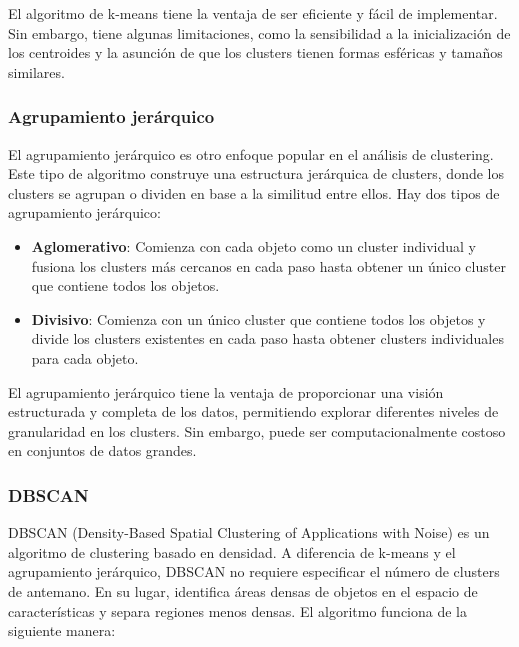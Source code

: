 \documentclass{article}
\begin{document}
El algoritmo de k-means tiene la ventaja de ser eficiente y fácil de implementar. Sin embargo, tiene algunas limitaciones, como la sensibilidad a la inicialización de los centroides y la asunción de que los clusters tienen formas esféricas y tamaños similares.
\subsubsection{Agrupamiento jerárquico}
El agrupamiento jerárquico es otro enfoque popular en el análisis de clustering. Este tipo de algoritmo construye una estructura jerárquica de clusters, donde los clusters se agrupan o dividen en base a la similitud entre ellos. Hay dos tipos de agrupamiento jerárquico:

\begin{itemize}
  \item \textbf{Aglomerativo}: Comienza con cada objeto como un cluster individual y fusiona los clusters más cercanos en cada paso hasta obtener un único cluster que contiene todos los objetos.
  \item \textbf{Divisivo}: Comienza con un único cluster que contiene todos los objetos y divide los clusters existentes en cada paso hasta obtener clusters individuales para cada objeto.
\end{itemize}

El agrupamiento jerárquico tiene la ventaja de proporcionar una visión estructurada y completa de los datos, permitiendo explorar diferentes niveles de granularidad en los clusters. Sin embargo, puede ser computacionalmente costoso en conjuntos de datos grandes.
\subsubsection{DBSCAN}
DBSCAN (Density-Based Spatial Clustering of Applications with Noise) es un algoritmo de clustering basado en densidad. A diferencia de k-means y el agrupamiento jerárquico, DBSCAN no requiere especificar el número de clusters de antemano. En su lugar, identifica áreas densas de objetos en el espacio de características y separa regiones menos densas. El algoritmo funciona de la siguiente manera:
\end{document}
